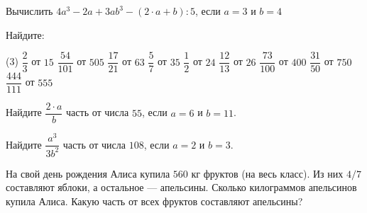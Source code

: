 \begin{class}[number=8]
	\begin{listofex}
	\item Вычислить \( 4a^3-2a+3ab^3-(2\cdot a+b):5 \), если \( a=3 \) и \( b=4 \)
	\item Найдите:
	\begin{tasks}(3)
		\task \( \dfrac{2}{3} \) от \( 15 \)
		\task \( \dfrac{54}{101} \) от \( 505 \)
		\task \( \dfrac{17}{21} \) от \( 63 \)
		\task \( \dfrac{5}{7} \) от \( 35 \)
		\task \( \dfrac{1}{2} \) от \( 24 \)
		\task \( \dfrac{12}{13} \) от \( 26 \)
		\task \( \dfrac{73}{100} \) от \( 400 \)
		\task \( \dfrac{31}{50} \) от \( 750 \)
		\task \( \dfrac{444}{111} \) от \( 555 \)
	\end{tasks}
	\item Найдите \( \dfrac{2\cdot a}{b} \) часть от числа \( 55 \), если \( a=6 \) и \( b=11 \).
	\item Найдите \( \dfrac{a^3}{3b^2} \) часть от числа \( 108 \), если \( a=2 \) и \( b=3 \).
	\item На свой день рождения Алиса купила \( 560 \) кг фруктов (на весь класс). Из них \( 4/7 \) составляют яблоки, а остальное --- апельсины. Сколько килограммов апельсинов купила Алиса. Какую часть от всех фруктов составляют апельсины?
	\end{listofex}
\end{class}
